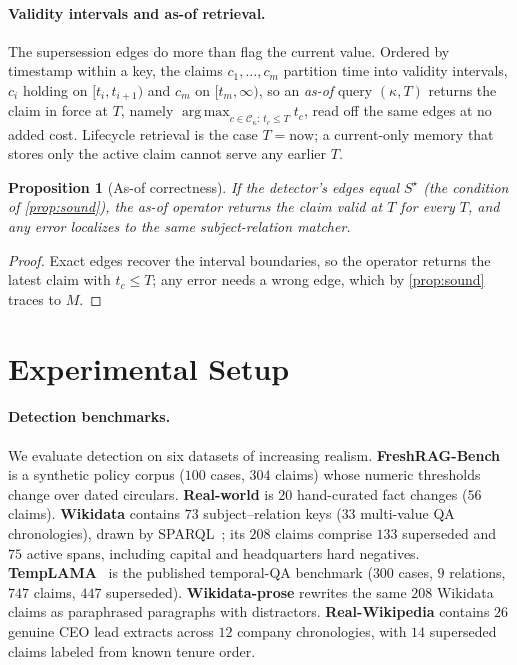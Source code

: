 \documentclass[letterpaper]{article}
\theoremstyle{plain}
\newtheorem{proposition}{Proposition}
\DeclareMathOperator*{\argmax}{arg\,max}
\begin{document}
\paragraph{Validity intervals and as-of retrieval.} The supersession edges do more than flag the current value. Ordered by timestamp within a key, the claims $c_1,\dots,c_m$ partition time into validity intervals, $c_i$ holding on $[t_i,t_{i+1})$ and $c_m$ on $[t_m,\infty)$, so an \emph{as-of} query $(\kappa,T)$ returns the claim in force at $T$, namely $\argmax_{c\in\mathcal{C}_\kappa:\,t_c\le T} t_c$, read off the same edges at no added cost. Lifecycle retrieval is the case $T{=}\text{now}$; a current-only memory that stores only the active claim cannot serve any earlier $T$.

\begin{proposition}[As-of correctness]
\label{prop:asof}
If the detector's edges equal $S^\star$ (the condition of \cref{prop:sound}), the as-of operator returns the claim valid at $T$ for every $T$, and any error localizes to the same subject-relation matcher.
\end{proposition}
\begin{proof}
Exact edges recover the interval boundaries, so the operator returns the latest claim with $t_c\le T$; any error needs a wrong edge, which by \cref{prop:sound} traces to $M$.
\end{proof}

\section{Experimental Setup}
\label{sec:setup}

\paragraph{Detection benchmarks.} We evaluate detection on six datasets of increasing realism. \textbf{FreshRAG-Bench} is a synthetic policy corpus ($100$ cases, $304$ claims) whose numeric thresholds change over dated circulars. \textbf{Real-world} is $20$ hand-curated fact changes ($56$ claims). \textbf{Wikidata} contains $73$ subject--relation keys ($33$ multi-value QA chronologies), drawn by SPARQL~\citep{vrandecic2014wikidata}; its $208$ claims comprise $133$ superseded and $75$ active spans, including capital and headquarters hard negatives. \textbf{TempLAMA}~\citep{dhingra2022templama} is the published temporal-QA benchmark ($300$ cases, $9$ relations, $747$ claims, $447$ superseded). \textbf{Wikidata-prose} rewrites the same $208$ Wikidata claims as paraphrased paragraphs with distractors. \textbf{Real-Wikipedia} contains $26$ genuine CEO lead extracts across $12$ company chronologies, with $14$ superseded claims labeled from known tenure order.
\end{document}
